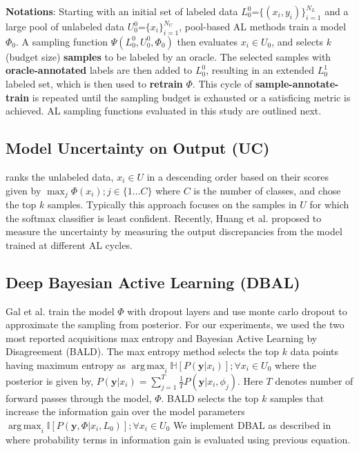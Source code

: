 \documentclass[10pt,twocolumn,letterpaper]{article}
\DeclareMathOperator*{\argmax}{arg\,max}
\begin{document}
\textbf{Notations}: Starting with an initial set of labeled data $L_{0}^{0}$=$\{(x_i, y_i)\}_{i=1}^{N_L}$ and a large pool of unlabeled data $U_{0}^{0}$=$\{ x_i\}_{i=1}^{N_U}$, pool-based AL methods train a model $\Phi_0$. A sampling function $\Psi(L_{0}^{0}, U_{0}^{0}, \Phi_0)$ then evaluates $x_i \in U_0$, and selects $k$ (budget size) \textbf{samples} to be labeled by an oracle. The selected samples with \textbf{oracle-annotated} labels are then added to $L_{0}^{0}$, resulting in an extended $L_{0}^{1}$ labeled set, which is then used to \textbf{retrain} $\Phi$. This cycle of \textbf{sample-annotate-train} is repeated until the sampling budget is exhausted or a satisficing metric is achieved. AL sampling functions evaluated in this study are outlined next. 


\subsection{Model Uncertainty on Output (UC)}
\cite{uncertainty_lewis1994sequential} ranks the unlabeled data, $x_i \in U$ in a descending order based on their scores given by $\max_{j}\Phi(x_i); j\in\{1\dots C\}$
where $C$ is the number of classes, and chose the top $k$ samples. Typically this approach focuses on the samples in $U$ for which the softmax classifier is least confident. Recently, Huang et al.\cite{tod_huang2021semi} proposed to measure the uncertainty by measuring the output discrepancies from the model trained at different AL cycles.

\subsection{Deep Bayesian Active Learning (DBAL)}

Gal et al. \cite{DBAL_gal2017deep} train the model $\Phi$ with dropout layers and use monte carlo dropout to approximate the sampling from posterior.  
For our experiments, we used the two most reported acquisitions \ie  max entropy and Bayesian Active Learning by Disagreement (BALD). The max entropy method selects the top $k$ data points having maximum entropy as $\argmax_i \mathbb{H} [P(\textbf{y}|x_i)]; \forall x_i \in U_0$
where the posterior is given by, 
$P(\textbf{y}|x_i) = \sum_{j=1}^{T}\frac{1}{T} P(\textbf{y}|x_i, \phi_{j})$.
Here $T$ denotes number of forward passes through the model, $\Phi$. 
BALD selects the top $k$ samples that increase the information gain over the model parameters \ie $
\argmax_i \mathbb{I}[P(\textbf{y},\Phi|x_i,L_0)]; \forall x_i \in U_0$
We implement DBAL as described in \cite{DBAL_gal2017deep} where probability terms in information gain is evaluated using previous equation. 
\end{document}
